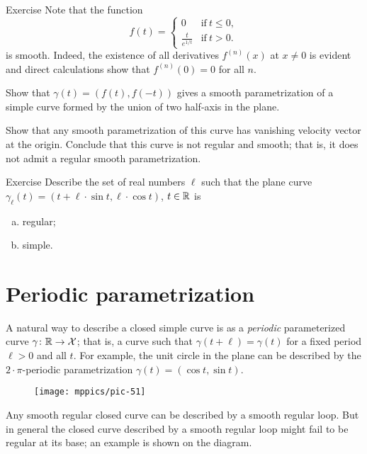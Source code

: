 \begin{thm}{Exercise}\label{ex:L-shape}
Note that the function 
\[f(t)=
\begin{cases}
0&\text{if}\ t\le 0,
\\
\frac{t}{e^{1\!/\!t}}&\text{if}\ t> 0.
\end{cases}
\]
is smooth. Indeed, the existence of all derivatives $f^{(n)}(x)$ at $x\ne 0$ is evident and direct calculations show that $f^{(n)}(0)=0$ for all $n$.

Show that $\gamma(t)=(f(t),f(-t))$ gives a smooth parametrization of a simple curve formed by the union of two half-axis in the plane.

Show that any smooth parametrization of this curve has vanishing velocity vector at the origin.
Conclude that this curve is not regular and smooth;
that is, it does not admit a regular smooth parametrization.
\end{thm}


\begin{thm}{Exercise}\label{ex:cycloid}
Describe the set of real numbers $\ell $
such that the plane curve $\gamma_\ell (t)= (t+\ell \cdot \sin t,\ell \cdot \cos t)$, $t\in\mathbb{R}$ is
\begin{enumerate}[(a)]
\item regular;
\item simple.
\end{enumerate}

\end{thm}

\section*{Periodic parametrization}
A natural way to describe a closed simple curve is as a \emph{periodic} parameterized curve $\gamma\colon \mathbb{R}\to \mathcal{X}$; that is, a curve such that $\gamma(t+\ell)=\gamma(t)$ for a fixed period $\ell > 0$ and all $t$.
For example, the unit circle in the plane can be described by the $2{\cdot}\pi$-periodic parametrization $\gamma(t)=(\cos t,\sin t)$.

{

\begin{wrapfigure}{o}{17 mm}
\vskip-3mm
\centering
\texttt{[image: mppics/pic-51]}
\end{wrapfigure}

Any smooth regular closed curve can be described by a smooth regular loop.
But in general the closed curve described by a smooth regular loop might fail to be regular at its base; an example is shown on the diagram.

}

